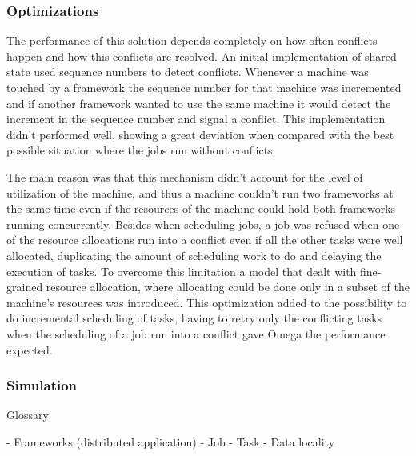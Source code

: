 \documentclass{svjour3}                     %
\begin{document}
\subsubsection{Optimizations}

The performance of this solution depends completely on how often
conflicts happen and how this conflicts are resolved. An initial
implementation of shared state used sequence numbers to detect
conflicts. Whenever a machine was touched by a framework the sequence
number for that machine was incremented and if another framework
wanted to use the same machine it would detect the increment in the
sequence number and signal a conflict. This implementation didn't
performed well, showing a great deviation when compared with the best
possible situation where the jobs run without conflicts.

The main reason was that this mechanism didn't account for the level
of utilization of the machine, and thus a machine couldn't run two
frameworks at the same time even if the resources of the machine could
hold both frameworks running concurrently. Besides when scheduling
jobs, a job was refused when one of the resource allocations run into
a conflict even if all the other tasks were well allocated,
duplicating the amount of scheduling work to do and delaying the
execution of tasks. To overcome this limitation a model that dealt
with fine-grained resource allocation, where allocating could be done
only in a subset of the machine's resources was introduced. This
optimization added to the possibility to do incremental scheduling of
tasks, having to retry only the conflicting tasks when the scheduling
of a job run into a conflict gave Omega the performance expected.

\subsubsection{Simulation}

Glossary

- Frameworks (distributed application)
- Job
- Task
- Data locality
\end{document}
